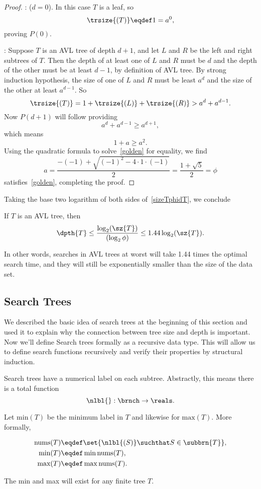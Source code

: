\begin{definition}
\begin{lemma}
\begin{proof}
: ($d=0$).
In this case $T$ is a leaf, so
\[
\trsize{(T)} \eqdef 1 = a^0,
\]
proving $P(0)$.

: Suppose $T$ is an AVL tree of depth
$d+1$, and let $L$ and $R$ be the left and right subtrees of $T$.
Then the depth of at least one of $L$ and $R$ must be $d$ and the
depth of the other must be at least $d-1$, by definition of AVL tree.
By strong induction hypothesis, the size of one of $L$ and $R$ must be
least $a^d$ and the size of the other at least $a^{d-1}$.  So
\[
\trsize{(T)}
  = 1 + \trsize{(L)} + \trsize{(R)}
  > a^d + a^{d-1}.
\]            
Now $P(d+1)$ will follow providing
\[
 a^d + a^{d-1} \geq a^{d+1},
\]
which means
\begin{equation}\label{golden}
1+a \geq a^2.
\end{equation}
Using the quadratic formula to solve~\eqref{golden} for equality, we find
\[
a = \frac{-(-1) + \sqrt{(-1)^2-4\cdot 1\cdot (-1)}}{2} = \frac{1 + \sqrt{5}}{2} = \phi
\]
satisfies~\eqref{golden}, completing the proof.
\end{proof}
\end{lemma}

Taking the base two logarithm of both sides of~\eqref{sizeTphidT}, we conclude
\begin{corollary}
If $T$ is an AVL tree, then
\[
\dpth{T} \leq \frac{\log_2(\sz{T})}{(\log_2 \phi)} \leq 1.44
\log_2(\sz{T}).
\]
\end{corollary}
In other words, searches in AVL trees at worst will take 1.44 times
the optimal search time, and they will still be exponentially smaller
than the size of the data set.

\subsection{Search Trees}
We described the basic idea of search trees at the beginning of this
section and used it to explain why the connection between tree size
and depth is important.  Now we'll define Search trees formally as a
recursive data type.  This will allow us to define search functions
recursively and verify their properties by structural induction.

Search trees have a numerical label on each subtree.  Abstractly, this
means there is a total function
\[
\nlbl{}:\brnch \to \reals.
\]

Let $\text{min}(T)$ be the minimum label in $T$ and likewise for
$\text{max}(T)$.  More formally,
\begin{definition}
\begin{align}
\text{nums}(T) & \eqdef \set{\nlbl{(S)} \suchthat S \in \subbrn{T}},\\
\text{min}(T) &\eqdef \min \text{nums}(T), \label{defminT}\\
\text{max}(T) &\eqdef \max \text{nums}(T).\label{defmaxT}
\end{align}
\end{definition}
The min and max will exist for any finite tree $T$.


\end{definition}
